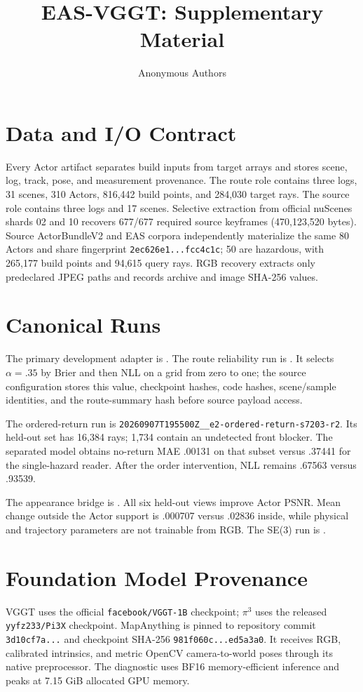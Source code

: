 \documentclass[10pt,twocolumn,letterpaper]{article}
\title{EAS-VGGT: Supplementary Material}
\author{Anonymous Authors}
\begin{document}
\maketitle

\section{Data and I/O Contract}
Every Actor artifact separates build inputs from target arrays and stores scene, log,
track, pose, and measurement provenance. The route role contains three logs, 31 scenes,
310 Actors, 816,442 build points, and 284,030 target rays. The source role contains three
logs and 17 scenes. Selective extraction from official nuScenes shards 02 and 10 recovers
677/677 required source keyframes (470,123,520 bytes). Source ActorBundleV2 and EAS
corpora independently materialize the same 80 Actors and share fingerprint
\texttt{2ec626e1...fcc4c1c}; 50 are hazardous, with 265,177 build points and 94,615 query
rays. RGB recovery extracts only predeclared JPEG paths and records archive and image
SHA-256 values.

\section{Canonical Runs}
The primary development adapter is
. The route reliability
run is . It selects
$\alpha=.35$ by Brier and then NLL on a grid from zero to one; the source configuration
stores this value, checkpoint hashes, code hashes, scene/sample identities, and the
route-summary hash before source payload access.

The ordered-return run is
\texttt{20260907T195500Z\_\_e2-ordered-return-s7203-r2}. Its held-out set has 16,384
rays; 1,734 contain an undetected front blocker. The separated model obtains no-return
MAE .00131 on that subset versus .37441 for the single-hazard reader. After the order
intervention, NLL remains .67563 versus .93539.

The appearance bridge is
. All six held-out views improve
Actor PSNR. Mean change outside the Actor support is .000707 versus .02836 inside, while
physical and trajectory parameters are not trainable from RGB. The SE(3) run is
.

\section{Foundation Model Provenance}
VGGT uses the official \texttt{facebook/VGGT-1B} checkpoint; $\pi^3$ uses the released
\texttt{yyfz233/Pi3X} checkpoint. MapAnything is pinned to repository commit
\texttt{3d10cf7a...} and checkpoint SHA-256 \texttt{981f060c...ed5a3a0}. It receives
RGB, calibrated intrinsics, and metric OpenCV camera-to-world poses through its native
preprocessor. The diagnostic uses BF16 memory-efficient inference and peaks at 7.15 GiB
allocated GPU memory.
\end{document}
